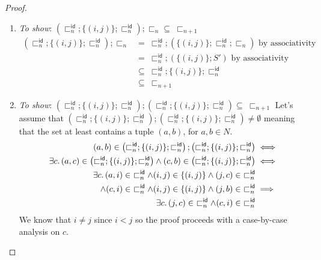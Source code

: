 \begin{lem}
{\begin{proof}
\begin{enumerate}[label=\alph*)]
\begin{align*}
				&\subseteq\ \sqsubset_{n + 1}
			\end{align*}
		\item \textit{To show}: $\left( \sqsubset_n^\mathsf{id} ; \{ (i, j) \} ; \sqsubset_n^\mathsf{id} \right) ; \sqsubset_n \subseteq\ \sqsubset_{n + 1}$
			\begin{align*}
				\left( \sqsubset_n^\mathsf{id} ; \{ (i, j) \} ; \sqsubset_n^\mathsf{id} \right) ; \sqsubset_n &=\ \sqsubset_n^\mathsf{id} ; \left( \{ (i, j) \} ; \sqsubset_n^\mathsf{id} ; \sqsubset_n \right) \text{ by associativity} \\
				&=\ \sqsubset_n^\mathsf{id} ; \left( \{ (i, j) \} ; S' \right) \text{ by associativity} \\
				&\subseteq\ \sqsubset_n^\mathsf{id} ; \{ (i, j) \} ; \sqsubset_n^\mathsf{id} \\
				&\subseteq\ \sqsubset_{n + 1}
			\end{align*}
		\item \textit{To show}: $\left( \sqsubset_n^\mathsf{id} ; \{ (i, j) \} ; \sqsubset_n^\mathsf{id} \right) ; \left( \sqsubset_n^\mathsf{id} ; \{ (i, j) \} ; \sqsubset_n^\mathsf{id} \right) \subseteq\ \sqsubset_{n + 1}$
			\iffalse
			Let's assume that $\left( \sqsubset_n^\mathsf{id} ; \{ (i, j) \} ; \sqsubset_n^\mathsf{id} \right) ; \left( \sqsubset_n^\mathsf{id} ; \{ (i, j) \} ; \sqsubset_n^\mathsf{id} \right) \neq \emptyset$ meaning that the set at least contains a tuple $(a, b)$, for $a, b \in N$. 
			\begin{align}
				(a, b) \in \left( \sqsubset_n^\mathsf{id} ; \{ (i, j) \} ; \sqsubset_n^\mathsf{id} \right) ; \left( \sqsubset_n^\mathsf{id} ; \{ (i, j) \} ; \sqsubset_n^\mathsf{id} \right)
					&\iff \\
				\exists c \ldotp (a, c) \in \left( \sqsubset_n^\mathsf{id} ; \{ (i, j) \} ; \sqsubset_n^\mathsf{id} \right) \land (c, b) \in \left( \sqsubset_n^\mathsf{id} ; \{ (i, j) \} ; \sqsubset_n^\mathsf{id} \right)
					&\iff \\
				\exists c \ldotp (a, i) \in\ \sqsubset_n^\mathsf{id} \land (i, j) \in  \{(i, j)\} \land (j, c) \in\ \sqsubset_n^\mathsf{id} \\ \land (c, i) \in\ \sqsubset_n^\mathsf{id} \land (i, j) \in  \{(i, j)\} \land (j, b) \in\ \sqsubset_n^\mathsf{id}
					&\implies \\
				\label{thm:total4} \exists c \ldotp (j, c) \in\ \sqsubset_n^\mathsf{id} \land (c, i) \in\ \sqsubset_n^\mathsf{id}
			\end{align}
			We know that $i \neq j$ since $i < j$ so the proof proceeds with a case-by-case analysis on $c$.

\end{enumerate}
\end{proof}}
\end{lem}
